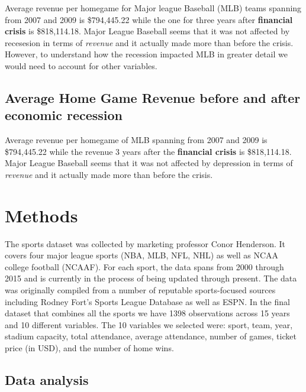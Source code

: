 \documentclass[man, fleqn, noextraspace,floatsintext]{apa6}
\begin{document}
Average revenue per homegame for Major league Baseball (MLB) teams
spanning from 2007 and 2009 is \$794,445.22 while the one for three
years after \textbf{financial crisis} is \$818,114.18. Major League
Baseball seems that it was not affected by recesesion in terms of
\emph{revenue} and it actually made more than before the crisis.
However, to understand how the recession impacted MLB in greater detail
we would need to account for other variables.

\subsection{Average Home Game Revenue before and after economic
recession}\label{average-home-game-revenue-before-and-after-economic-recession}

Average revenue per homegame of MLB spanning from 2007 and 2009 is
\$794,445.22 while the revenue 3 years after the \textbf{financial
crisis} is \$818,114.18. Major League Baseball seems that it was not
affected by depression in terms of \emph{revenue} and it actually made
more than before the crisis.

\section{Methods}\label{methods}

The sports dataset was collected by marketing professor Conor Henderson.
It covers four major league sports (NBA, MLB, NFL, NHL) as well as NCAA
college football (NCAAF). For each sport, the data spans from 2000
through 2015 and is currently in the process of being updated through
present. The data was originally compiled from a number of reputable
sports-focused sources including Rodney Fort's Sports League Database as
well as ESPN. In the final dataset that combines all the sports we have
1398 observations across 15 years and 10 different variables. The 10
variables we selected were: sport, team, year, stadium capacity, total
attendance, average attendance, number of games, ticket price (in USD),
and the number of home wins.

\subsection{Data analysis}\label{data-analysis}
\end{document}
